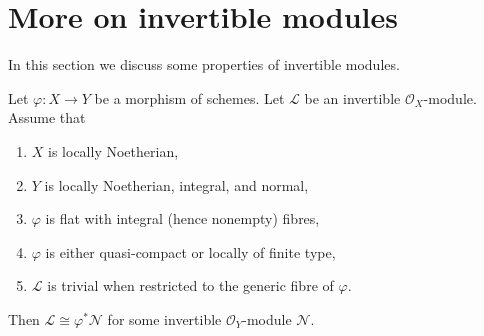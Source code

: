\section{More on invertible modules}
\label{section-invertible-modules}

\noindent
In this section we discuss some properties of invertible modules.

\begin{lemma}
\label{lemma-in-image-pullback}
Let $\varphi : X \to Y$ be a morphism of schemes. Let $\mathcal{L}$
be an invertible $\mathcal{O}_X$-module. Assume that
\begin{enumerate}
\item $X$ is locally Noetherian,
\item $Y$ is locally Noetherian, integral, and normal,
\item $\varphi$ is flat with integral (hence nonempty) fibres,
\item $\varphi$ is either quasi-compact or locally of finite type,
\item $\mathcal{L}$ is trivial when restricted to the generic fibre of
$\varphi$.
\end{enumerate}
Then $\mathcal{L} \cong \varphi^*\mathcal{N}$ for some invertible
$\mathcal{O}_Y$-module $\mathcal{N}$.
\end{lemma}

